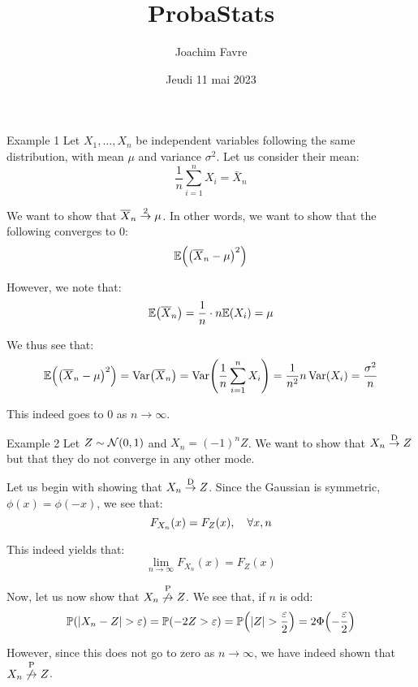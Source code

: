 \documentclass[a4paper]{article}
\title{ProbaStats}
\author{Joachim Favre}
\date{Jeudi 11 mai 2023}
\begin{document}
\maketitle


\begin{parag}{Example 1}
    Let $X_1, \ldots, X_n$ be independent variables following the same distribution, with mean $\mu$ and variance $\sigma^2$. Let us consider their mean: 
    \[\frac{1}{n} \sum_{i=1}^{n} X_i = \bar{X}_n\]
    
    We want to show that $\bar{X}_n \over{\to}{2} \mu$. In other words, we want to show that the following converges to $0$: 
    \[\exval\left(\left(\bar{X}_n - \mu\right)^2\right)\]
    
    However, we note that: 
    \[\exval\left(\bar{X}_n\right) = \frac{1}{n}\cdot n \exval\left(X_i\right) = \mu\]
    
    We thus see that: 
    \[\exval\left(\left(\bar{X}_n - \mu\right)^2\right) = \Var\left(\bar{X}_n\right) = \Var\left(\frac{1}{n} \sum_{i=1}^{n} X_i\right) = \frac{1}{n^2} n \Var\left(X_i\right) = \frac{\sigma^2}{n}\]
    
    This indeed goes to 0 as $n \to \infty$.
\end{parag}

\begin{parag}{Example 2}
    Let $Z \followsdistr \mathcal{N}\left(0, 1\right)$ and $X_n = \left(-1\right)^n Z$. We want to show that $X_n \over{\to}{D} Z$ but that they do not converge in any other mode.

    Let us begin with showing that $X_n \over{\to}{D} Z$. Since the Gaussian is symmetric, $\phi\left(x\right) = \phi\left(-x\right)$, we see that: 
    \[F_{X_n}\left(x\right) = F_{Z}\left(x\right), \mathspace \forall x, n\]
    
    This indeed yields that:
    \[\lim_{n \to \infty} F_{X_n}\left(x\right) = F_Z\left(x\right)\]
    
    Now, let us now show that $X_n \over{\not\to}{P} Z$. We see that, if $n$ is odd: 
    \[\prob\left(\left|X_n - Z\right| > \epsilon\right) = \prob\left(-2Z > \epsilon\right) = \prob\left(\left|Z\right| > \frac{\epsilon}{2}\right) = 2\Phi\left(-\frac{\epsilon}{2}\right)\]

    However, since this does not go to zero as $n \to \infty$, we have indeed shown that $X_n \over{\not\to}{P} Z$.
\end{parag}
\end{document}
